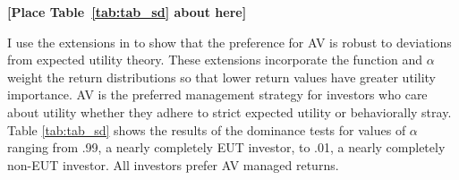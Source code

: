\bigskip
\centerline{\bf [Place Table~\ref{tab:tab_sd} about here]}
\bigskip

I use the extensions in \citet{vinod_generalized_2016} to show that the preference for AV is robust to deviations from expected utility theory. These extensions incorporate the \citet{prelec_probability_1998} function and $\alpha$ weight the return distributions so that lower return values have greater utility importance. AV is the preferred management strategy for investors who care about utility whether they adhere to strict expected utility or behaviorally stray. Table \ref{tab:tab_sd} shows the results of the dominance tests for values of $\alpha$ ranging from .99, a nearly completely EUT investor, to .01, a nearly completely non-EUT investor. All investors prefer AV managed returns.

